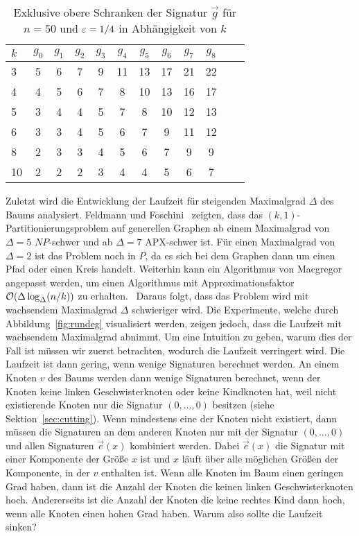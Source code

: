 \begin{table}
    \centering
    \begin{tabular}{l*{11}{c}}
        \toprule
        $k$ & $g_0$ & $g_1$ & $g_2$ & $g_3$ & $g_4$ & $g_5$ & $g_6$ & $g_7$ & $g_8$ \\
        \midrule
        3 & 5 & 6 & 7 & 9 & 11 & 13 & 17 & 21 & 22 \\
        4 & 4 & 5 & 6 & 7 & 8 & 10 & 13 & 16 & 17 \\
        5 & 3 & 4 & 4 & 5 & 7 & 8 & 10 & 12 & 13 \\ 
        6 & 3 & 3 & 4 & 5 & 6 & 7 & 9 & 11 & 12 \\ 
        8 & 2 & 3 & 3 & 4 & 5 & 6 & 7 & 9 & 9 \\ 
        10 & 2 & 2 & 2 & 3 & 4 & 4 & 5 & 6 & 7 \\ 
        \bottomrule
    \end{tabular}
    \caption{Exklusive obere Schranken der Signatur $\vec{g}$ für $n=50$ und $\varepsilon=1/4$ in Abhängigkeit von $k$}\label{tab:ksig}
\end{table}

Zuletzt wird die Entwicklung der Laufzeit für steigenden Maximalgrad $\Delta$ des Baums analysiert.
Feldmann und Foschini~\cite{FF15} zeigten, dass das $(k, 1)$\hyp Partitionierungsproblem auf generellen Graphen ab einem Maximalgrad von $\Delta=5$ $NP$\hyp schwer und ab $\Delta=7$ APX-schwer ist.
Für einen Maximalgrad von $\Delta=2$ ist das Problem noch in $P$, da es sich bei dem Graphen dann um einen Pfad oder einen Kreis handelt.
Weiterhin kann ein Algorithmus von Macgregor~\cite{mcg78} angepasst werden, um einen Algorithmus mit Approximationsfaktor $\mathcal{O}(\Delta \log_\Delta(n/k))$ zu erhalten.~\cite{FF15}
Daraus folgt, dass das Problem wird mit wachsendem Maximalgrad $\Delta$ schwieriger wird.
Die Experimente, welche durch Abbildung~\ref{fig:rundeg} visualisiert werden, zeigen jedoch, dass die Laufzeit mit wachsendem Maximalgrad abnimmt.
Um eine Intuition zu geben, warum dies der Fall ist müssen wir zuerst betrachten, wodurch die Laufzeit verringert wird.
Die Laufzeit ist dann gering, wenn wenige Signaturen berechnet werden.
An einem Knoten $v$ des Baums werden dann wenige Signaturen berechnet, wenn der Knoten keine linken Geschwisterknoten oder keine Kindknoten hat, weil nicht existierende Knoten nur die Signatur $(0, \ldots, 0)$ besitzen (siehe Sektion~\ref{sec:cutting}).
Wenn mindestens eine der Knoten nicht existiert, dann müssen die Signaturen an dem anderen Knoten nur mit der Signatur $(0, \ldots, 0)$ und allen Signaturen $\vec{e}(x)$ kombiniert werden.
Dabei $\vec{e}(x)$ die Signatur mit einer Komponente der Größe $x$ ist und $x$ läuft über alle möglichen Größen der Komponente, in der $v$ enthalten ist.
Wenn alle Knoten im Baum einen geringen Grad haben, dann ist die Anzahl der Knoten die keinen linken Geschwisterknoten hoch. 
Andererseits ist die Anzahl der Knoten die keine rechtes Kind dann hoch, wenn alle Knoten einen hohen Grad haben.
Warum also sollte die Laufzeit sinken?


